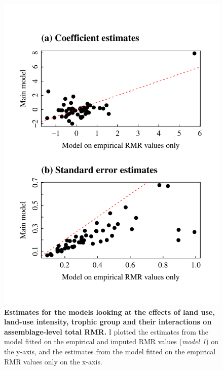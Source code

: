 \begin{figure}[h!]
\centering
\includegraphics[scale=0.7]{Supporting/Chapter5/Figures/SI_Coefficients_Complete_against_Imputed}
\caption[Estimates for the models looking at the effects of land use, land-use intensity, trophic group and their interactions on assemblage-level total RMR]{\textbf{Estimates for the models looking at the effects of land use, land-use intensity, trophic group and their interactions on assemblage-level total RMR.} I plotted the estimates from the model fitted on the empirical and imputed RMR values (\textit{model 1}) on the y-axis, and the estimates from the model fitted on the empirical RMR values only on the x-axis.}
\label{SI5_figure4}
\end{figure}


